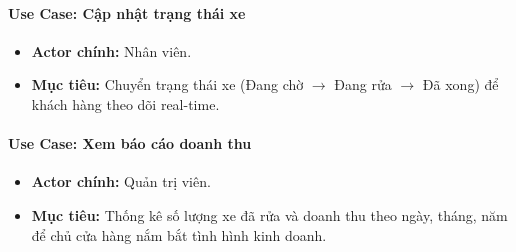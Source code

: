 \paragraph{Use Case: Cập nhật trạng thái xe}
\begin{itemize}
    \item \textbf{Actor chính:} Nhân viên.
    \item \textbf{Mục tiêu:} Chuyển trạng thái xe (Đang chờ $\rightarrow$ Đang rửa $\rightarrow$ Đã xong) để khách hàng theo dõi real-time.
\end{itemize}

\paragraph{Use Case: Xem báo cáo doanh thu}
\begin{itemize}
    \item \textbf{Actor chính:} Quản trị viên.
    \item \textbf{Mục tiêu:} Thống kê số lượng xe đã rửa và doanh thu theo ngày, tháng, năm để chủ cửa hàng nắm bắt tình hình kinh doanh.
\end{itemize}